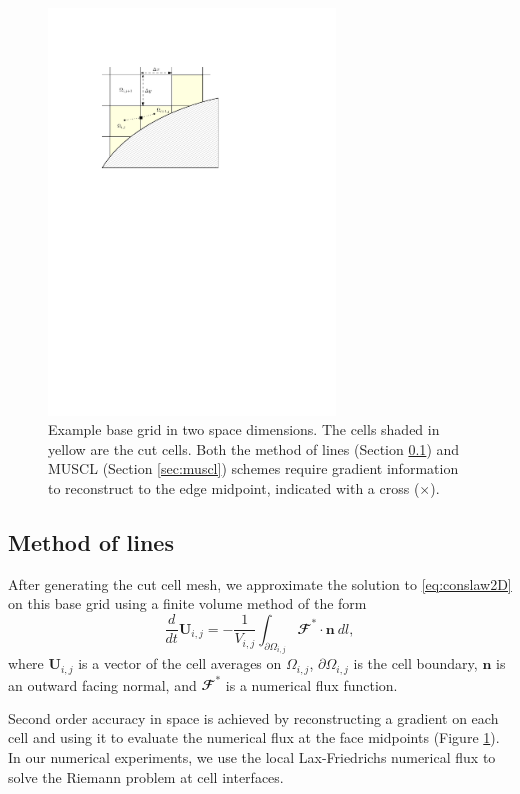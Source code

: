 \begin{figure}
\begin{center}
\includegraphics[width=3.0in]{figs/example_ccmesh.pdf}
\caption{\sf Example base grid in two space dimensions. The cells shaded in yellow are the cut cells.  Both the method of lines (Section \ref{sec:mol}) and MUSCL (Section \ref{sec:muscl}) schemes require gradient information to reconstruct to the edge midpoint, indicated with a cross ($\times$).} 
\label{fig:2dfig}
\end{center}
\end{figure}


\subsection{Method of lines} \label{sec:mol}

After generating the cut cell mesh, we approximate the solution to \eqref{eq:conslaw2D} on this base grid using a finite volume method of the form
\begin{equation}\label{eq:fvscheme}
\frac{d}{dt}\mathbf{U}_{i,j} =- \frac{1}{V_{i,j}} \int_{\partial \Omega_{i,j}} \mathbfcal{F} ^* \cdot \mathbf{n} ~dl,
\end{equation}
where $\mathbf{U}_{i,j}$ is a vector of the cell averages on $\Omega_{i,j}$, $\partial \Omega_{i,j}$ is the cell boundary, $\mathbf{n}$ is an outward facing normal, and $\mathbfcal{F}^*$ is a numerical flux function.

Second order accuracy in space is achieved by reconstructing a gradient on each cell and using it to evaluate the numerical flux at the face midpoints (Figure \ref{fig:2dfig}).  
In our numerical experiments, we use the local Lax-Friedrichs numerical flux to solve the Riemann problem at cell interfaces.

